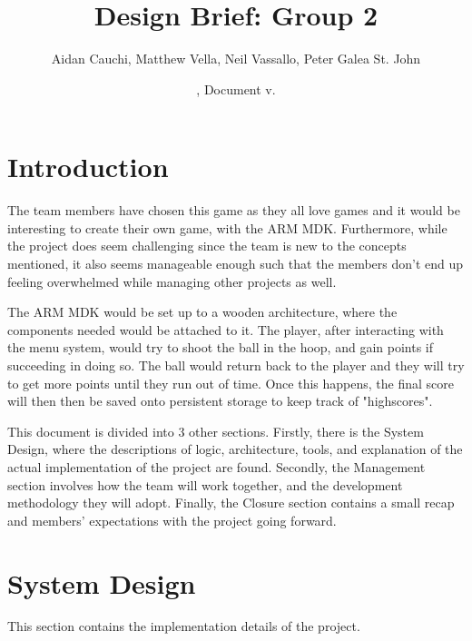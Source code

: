 \documentclass[11pt,a4paper,twocolumn]{article}
\title{Design Brief: Group 2}
\author{
   Aidan Cauchi,
   Matthew Vella,
   Neil Vassallo,
   Peter Galea St. John
   }
\date{\svnMaxToday, Document v.\svnInfoMaxRevision}
\begin{document}
\maketitle


\section{Introduction}
\par{The team members have chosen this game as they all love games and it would be interesting to create their own game, with the ARM MDK. Furthermore, while the project does seem challenging since the team is new to the concepts mentioned, 
it also seems manageable enough such that the members don't end up feeling overwhelmed while managing other projects as well.}
\newline

\par{The ARM MDK would be set up to a wooden architecture, where the components needed would be attached to it.
The player, after interacting with the menu system, would try to shoot the ball in the hoop, and gain points if succeeding in doing so. 
The ball would return back to the player and they will try to get more points until they run out of time. Once this happens, the final score will then then be saved onto persistent storage to keep track of "highscores".}
\newline


\par{This document is divided into 3 other sections.
Firstly, there is the System Design, where the descriptions of logic, architecture, tools, and explanation of the actual implementation of the project are found.
Secondly, the Management section involves how the team will work together, and the development methodology they will adopt. 
Finally, the Closure section contains a small recap and members' expectations with the project going forward.}


\section{System Design}
This section contains the implementation details of the project.
\end{document}
